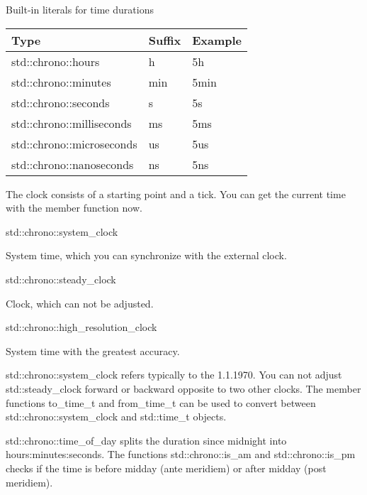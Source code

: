 \begin{center}
Built-in literals for time durations
\end{center}

\begin{longtable}[c]{lll}
\textbf{Type}             & \textbf{Suffix} & \textbf{Example} \\
\endfirsthead
%
\endhead
%
std::chrono::hours        & h               & 5h               \\
std::chrono::minutes      & min             & 5min             \\
std::chrono::seconds      & s               & 5s               \\
std::chrono::milliseconds & ms              & 5ms              \\
std::chrono::microseconds & us              & 5us              \\
std::chrono::nanoseconds  & ns              & 5ns             
\end{longtable}


The clock consists of a starting point and a tick. You can get the current time with the member function now.

\noindent
std::chrono::system\_clock 

System time, which you can synchronize with the external clock.

\noindent
std::chrono::steady\_clock 

Clock, which can not be adjusted.

\noindent
std::chrono::high\_resolution\_clock 

System time with the greatest accuracy.

std::chrono::system\_clock refers typically to the 1.1.1970. You can not adjust std::steady\_clock forward or backward opposite to two other clocks. The member functions to\_time\_t and from\_time\_t can be used to convert between std::chrono::system\_clock and std::time\_t objects.


std::chrono::time\_of\_day splits the duration since midnight into hours:minutes:seconds. The functions std::chrono::is\_am and std::chrono::is\_pm checks if the time is before midday (ante meridiem) or after midday (post meridiem).


